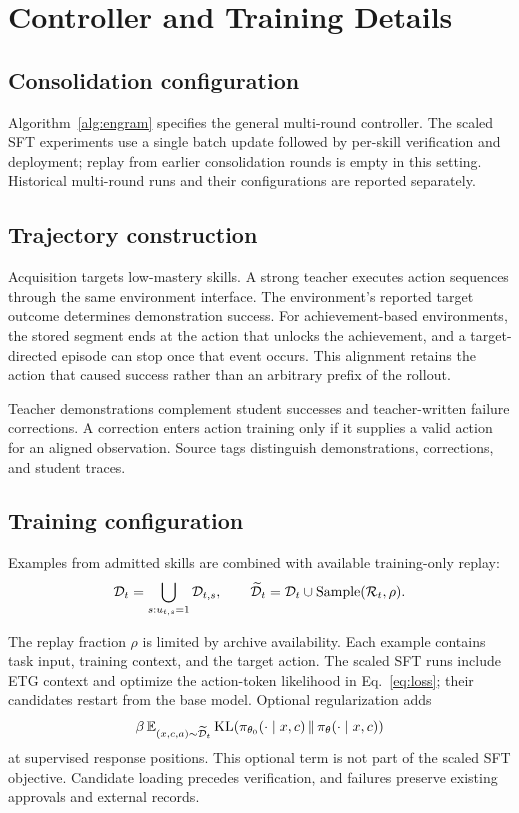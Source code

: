 \section{Controller and Training Details}
\label{app:method}
\subsection{Consolidation configuration}
Algorithm~\ref{alg:engram} specifies the general multi-round controller. The scaled SFT experiments use a single batch update followed by per-skill verification and deployment; replay from earlier consolidation rounds is empty in this setting. Historical multi-round runs and their configurations are reported separately.

\subsection{Trajectory construction}
Acquisition targets low-mastery skills. A strong teacher executes action sequences through the same environment interface. The environment's reported target outcome determines demonstration success. For achievement-based environments, the stored segment ends at the action that unlocks the achievement, and a target-directed episode can stop once that event occurs. This alignment retains the action that caused success rather than an arbitrary prefix of the rollout.

Teacher demonstrations complement student successes and teacher-written failure corrections. A correction enters action training only if it supplies a valid action for an aligned observation. Source tags distinguish demonstrations, corrections, and student traces.

\subsection{Training configuration}
Examples from admitted skills are combined with available training-only replay:
\begin{equation}
 \mathcal{D}_t=\bigcup_{s:u_{t,s}=1}\mathcal{D}_{t,s},\qquad
 \widetilde{\mathcal{D}}_t=\mathcal{D}_t\cup
 \operatorname{Sample}(\mathcal{R}_t,\rho).
\label{eq:dataset}
\end{equation}

The replay fraction $\rho$ is limited by archive availability. Each example contains task input, training context, and the target action. The scaled SFT runs include ETG context and optimize the action-token likelihood in Eq.~\eqref{eq:loss}; their candidates restart from the base model. Optional regularization adds
\begin{equation}
\beta\,\mathbb{E}_{(x,c,a)\sim\widetilde{\mathcal{D}}_t}
\operatorname{KL}\!\left(\pi_{\theta_0}(\cdot\mid x,c)\,\|\,\pi_\theta(\cdot\mid x,c)\right)
\end{equation}
at supervised response positions. This optional term is not part of the scaled SFT objective. Candidate loading precedes verification, and failures preserve existing approvals and external records.

